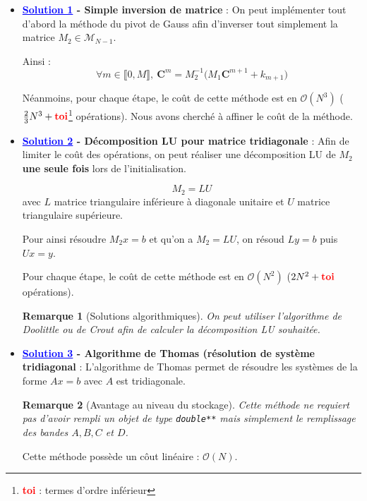 \documentclass[11pt,a4paper]{article}
\newcommand*{\intval}[2]{\llbracket #1, #2 \rrbracket}
\newcommand*{\C}[2]{\mathbf{C}^{#1}_{#2}}
\theoremstyle{plain}
\newtheorem{rmq}{Remarque}
\begin{document}
\begin{itemize}
    \item \textbf{\textcolor{blue}{\underline{Solution 1}} - Simple inversion de matrice} :
On peut implémenter tout d'abord la méthode du pivot de Gauss afin d'inverser tout simplement la matrice $M_2 \in \mathcal{M}_{N - 1}$.

Ainsi :
$$\forall m \in \intval{0}{M}, \ \C{m}{} = M_2^{-1}\Big(M_1\C{m + 1}{} + k_{m + 1}\Big)$$

Néanmoins, pour chaque étape, le coût de cette méthode est en $\mathcal{O}(N^3)$
($\frac{2}{3}N^3 + \textcolor{red}{\textbf{toi}}$\footnote{\textcolor{red}{\textbf{toi}} : termes d'ordre inférieur} opérations). Nous avons cherché à affiner le coût de la méthode.

\item \textbf{\textcolor{blue}{\underline{Solution 2}} - Décomposition LU pour matrice tridiagonale} :
Afin de limiter le coût des opérations, on peut réaliser une décomposition LU de $M_2$ \textbf{une seule fois} lors de l'initialisation.

$$M_2 = LU$$
avec $L$ matrice triangulaire inférieure à diagonale unitaire et $U$ matrice triangulaire supérieure.

Pour ainsi résoudre $M_2x = b$ et qu'on a $M_2 = LU$, on résoud $Ly = b$ puis $Ux = y$.

Pour chaque étape, le coût de cette méthode est en $\mathcal{O}(N^2)$ ($2N^2 + \textcolor{red}{\textbf{toi}}$ opérations).

\vspace{3mm}

\begin{rmq}[Solutions algorithmiques]
On peut utiliser l'algorithme de Doolittle ou de Crout afin de calculer la décomposition LU souhaitée.
\end{rmq}

\item \textbf{\textcolor{blue}{\underline{Solution 3}} - Algorithme de Thomas (résolution de système tridiagonal} :
L'algorithme de Thomas permet de résoudre les systèmes de la forme $Ax = b$ avec $A$ est tridiagonale.

\vspace{3mm}

\begin{rmq}[Avantage au niveau du stockage]
Cette méthode ne requiert pas d'avoir rempli un objet de type \texttt{double**} mais simplement le remplissage des bandes $A, B, C$ et $D$.
\end{rmq}

\vspace{2mm}

Cette méthode possède un côut linéaire : $\mathcal{O}(N)$.
\end{itemize}
\end{document}
